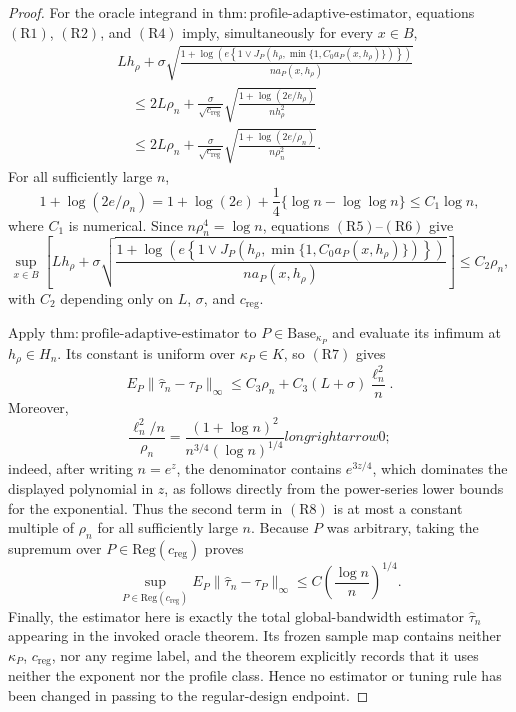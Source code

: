 \documentclass{article}
\begin{document}
\begin{proof}
For the oracle integrand in
\(\mathrm{thm{:}profile\text{-}adaptive\text{-}estimator}\), equations
\((\mathrm{R1})\), \((\mathrm{R2})\), and \((\mathrm{R4})\) imply,
simultaneously for every \(x\in B\),
\[
\begin{aligned}
&Lh_{\rho}+\sigma\sqrt{
 \frac{1+\log\!\left(
 e\left\{1\vee J_P\!\left(h_{\rho},
 \min\{1,C_0a_P(x,h_{\rho})\}\right)\right\}\right)}
 {n a_P(x,h_{\rho})}} \\
&\quad\leq 2L\rho_n+
 \frac{\sigma}{\sqrt{c_{\mathrm{reg}}}}
 \sqrt{\frac{1+\log(2e/h_{\rho})}{n h_{\rho}^2}} \\
&\quad\leq 2L\rho_n+
 \frac{\sigma}{\sqrt{c_{\mathrm{reg}}}}
 \sqrt{\frac{1+\log(2e/\rho_n)}{n\rho_n^2}}. \tag{R5}
\end{aligned}
\]
For all sufficiently large \(n\),
\[
 1+\log(2e/\rho_n)
 =1+\log(2e)+\frac14\{\log n-\log\log n\}
 \leq C_1\log n, \tag{R6}
\]
where \(C_1\) is numerical.  Since \(n\rho_n^4=\log n\), equations
\((\mathrm{R5})\)--\((\mathrm{R6})\) give
\[
 \sup_{x\in B}\left[
 Lh_{\rho}+\sigma\sqrt{
 \frac{1+\log\!\left(
 e\left\{1\vee J_P\!\left(h_{\rho},
 \min\{1,C_0a_P(x,h_{\rho})\}\right)\right\}\right)}
 {n a_P(x,h_{\rho})}}
 \right]
 \leq C_2\rho_n, \tag{R7}
\]
with \(C_2\) depending only on \(L\), \(\sigma\), and
\(c_{\mathrm{reg}}\).

Apply \(\mathrm{thm{:}profile\text{-}adaptive\text{-}estimator}\) to
\(P\in\mathrm{Base}_{\kappa_P}\) and evaluate its infimum at
\(h_{\rho}\in H_n\).  Its constant is uniform over
\(\kappa_P\in K\), so \((\mathrm{R7})\) gives
\[
 E_P\|\widehat\tau_n-\tau_P\|_\infty
 \leq C_3\rho_n+C_3(L+\sigma)\frac{\ell_n^2}{n}. \tag{R8}
\]
Moreover,
\[
 \frac{\ell_n^2/n}{\rho_n}
 =\frac{(1+\log n)^2}{n^{3/4}(\log n)^{1/4}}longrightarrow0; \tag{R9}
\]
indeed, after writing \(n=e^z\), the denominator contains
\(e^{3z/4}\), which dominates the displayed polynomial in \(z\), as
follows directly from the power-series lower bounds for the exponential.
Thus the second term in \((\mathrm{R8})\) is at most a constant multiple of
\(\rho_n\) for all sufficiently large \(n\).  Because \(P\) was arbitrary,
taking the supremum over \(P\in\mathrm{Reg}(c_{\mathrm{reg}})\) proves
\[
 \sup_{P\in\mathrm{Reg}(c_{\mathrm{reg}})}
 E_P\|\widehat\tau_n-\tau_P\|_\infty
 \leq C\left(\frac{\log n}{n}\right)^{1/4}.
\]
Finally, the estimator here is exactly the total global-bandwidth estimator
\(\widehat\tau_n\) appearing in the invoked oracle theorem.  Its frozen
sample map contains neither \(\kappa_P\), \(c_{\mathrm{reg}}\), nor any
regime label, and the theorem explicitly records that it uses neither the
exponent nor the profile class.  Hence no estimator or tuning rule has been
changed in passing to the regular-design endpoint.
\end{proof}
\end{document}
